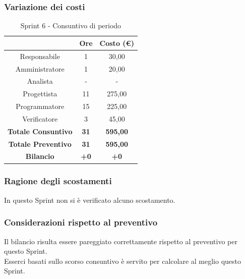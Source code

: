 \subsubsection{Variazione dei costi} \label{subsubsection:variazione_costi_sprint5}

\begin{table}[H]
  \centering
  \renewcommand{\arraystretch}{1.8}
  \begin{tabular}{c|c|c}
    \rowcolor[HTML]{125E28}
    \multicolumn{1}{c}{\color[HTML]{FFFFFF}\textbf{Ruolo}} &
    \multicolumn{1}{c}{\color[HTML]{FFFFFF}\textbf{Ore}}   &
    \multicolumn{1}{c}{\color[HTML]{FFFFFF}\textbf{Costo (€)}}                             \\
    \hline
    Responsabile                                           & 1           & 30,00           \\
    Amministratore                                         & 1           & 20,00           \\
    Analista                                               & -           & -               \\
    Progettista                                            & 11          & 275,00          \\
    Programmatore                                          & 15          & 225,00          \\
    Verificatore                                           & 3           & 45,00           \\
    \textbf{Totale Consuntivo}                             & \textbf{31} & \textbf{595,00} \\
    \textbf{Totale Preventivo}                             & \textbf{31} & \textbf{595,00} \\
    \textbf{Bilancio}                                      & \textbf{+0} & \textbf{+0}     \\
  \end{tabular}
  \caption{Sprint 6 - Consuntivo di periodo}
\end{table}

\subsubsection{Ragione degli scostamenti} \label{subsubsection:ragione_scostamenti_sprint5}
In questo Sprint\glo{} non si è verificato alcuno scostamento.

\subsubsection{Considerazioni rispetto al preventivo} \label{subsubsection:considerazioni_finali_sprint5}
Il bilancio risulta essere pareggiato correttamente rispetto al preventivo per questo Sprint\glo{}.
\\Esserci basati sullo scorso consuntivo è servito per calcolare al meglio questo Sprint\glo{}.

